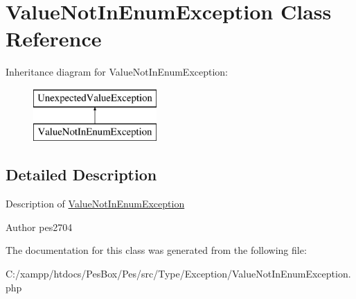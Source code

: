 \hypertarget{class_pes_1_1_type_1_1_exception_1_1_value_not_in_enum_exception}{}\section{Value\+Not\+In\+Enum\+Exception Class Reference}
\label{class_pes_1_1_type_1_1_exception_1_1_value_not_in_enum_exception}
Inheritance diagram for Value\+Not\+In\+Enum\+Exception\+:\begin{figure}[H]
\begin{center}
\leavevmode
\includegraphics[height=2.000000cm]{class_pes_1_1_type_1_1_exception_1_1_value_not_in_enum_exception}
\end{center}
\end{figure}


\subsection{Detailed Description}
Description of \mbox{\hyperlink{class_pes_1_1_type_1_1_exception_1_1_value_not_in_enum_exception}{Value\+Not\+In\+Enum\+Exception}}

\begin{DoxyAuthor}{Author}
pes2704 
\end{DoxyAuthor}


The documentation for this class was generated from the following file\+:\begin{DoxyCompactItemize}
\item 
C\+:/xampp/htdocs/\+Pes\+Box/\+Pes/src/\+Type/\+Exception/Value\+Not\+In\+Enum\+Exception.\+php\end{DoxyCompactItemize}
